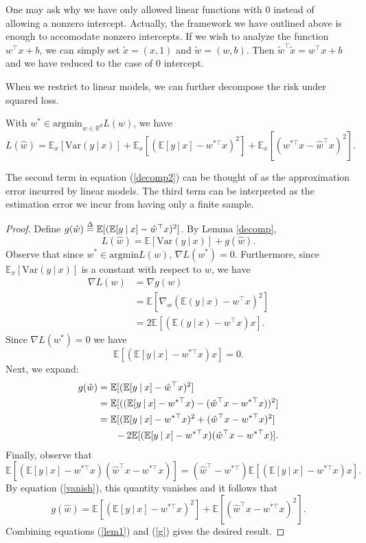 \documentclass[]{subook}
\newcommand\defn{\stackrel{\mathclap{\tiny\Delta}}{=}}
\newcommand\E{\mathbb{E}}
\newcommand\Var{\mathrm{Var}}
\begin{document}
One may ask why we have only allowed linear functions with $0$ instead of allowing a nonzero intercept. Actually, the framework we have outlined above is enough to accomodate nonzero intercepts. If we wish to analyze the function $w^\top x + b$, we can simply set $\tilde{x} = (x,1)$ and $\tilde{w} = (w,b)$. Then $\tilde{w}^\top \tilde{x} = w^\top x + b$ and we have reduced to the case of $0$ intercept.

When we restrict to linear models, we can further decompose the risk under squared loss.
\begin{lemma} \label{lin}
With $w^*\in \mathrm{argmin}_{w\in \mathbb{R}^d}L(w)$, we have \begin{equation}\label{decomp2}L(\hat{w}) = \E_x [\Var(y \: | \: x)] + \E_x[(\E[y\: | \: x]-w^{*\top} x)^2] + \E_x[(w^{*\top} x-\hat{w}^\top x)^2].\end{equation}
\end{lemma}
The second term in equation (\ref{decomp2}) can be thought of as the approximation error incurred by linear models. The third term can be interpreted as the estimation error we incur from having only a finite sample.
\begin{proof}
Define $g(\hat{w}) \defn \E[(\E[y\: | \: x]-\hat{w}^\top x)^2]$. By Lemma \ref{decomp}, \begin{equation}\label{lem1}L(\hat{w}) = \E[\Var(y\: | \: x)] + g(\hat{w}).\end{equation} Observe that since $w^*\in \mathrm{argmin} L(w)$, $\nabla L(w^*)=0$. Furthermore, since $\E_x[\Var(y\: | \: x)]$ is a constant with respect to $w$, we have
\begin{align*}
    \nabla L(w) &= \nabla g(w) \\
    &= \E[\nabla_w(\E(y\: | \: x) -w^\top x)^2] \\
    &= 2\E[(\E(y\: | \: x) - w^\top x)x].
\end{align*}
Since $\nabla L(w^*)=0$ we have \begin{equation}\label{vanish}\E[(\E[y \: | \: x]-w^{*\top}x)x]=0.\end{equation} Next, we expand:
\begin{align*}
    g(\hat{w}) &= \E[(\E[y\: | \: x]-\hat{w}^\top x)^2] \\
    &= \E[((\E[y\: | \:x]-w^{*\top}x)-(\hat{w}^\top x-w^{*\top}x))^2] \\
    &=\E[(\E[y\: | \: x] - w^{*\top}x)^2 + (\hat{w}^\top x - w^{*\top}x)^2] \\
    &\hspace{.25in} -2\E[(\E[y \: | \: x] - w^{*\top}x)(\hat{w}^\top x-w^{*\top}x)].
\end{align*}
Finally, observe that $$\E[(\E[y\: | \:x] - w^{*\top}x)(\hat{w}^\top x - w^{*\top}x)] = (\hat{w}^\top - w^{*\top})\E[(\E[y\:|\:x]-w^{*\top}x)x].$$ By equation (\ref{vanish}), this quantity vanishes and it follows that
\begin{equation}\label{g}g(\hat{w}) = \E[(\E[y\: | \: x] - w^{*\top}x)^2] + \E[(\hat{w}^\top x - w^{*\top}x)^2].\end{equation} Combining equations (\ref{lem1}) and (\ref{g}) gives the desired result. 
\end{proof}
\end{document}
